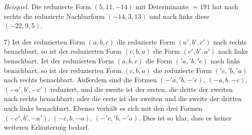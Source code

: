 \textit{Beispiel.} Die reduzierte Form $(5,11,-14)$ mit Determinante $=191$ hat nach rechts die reduzierte Nachbarform $(-14,3,13)$ und nach links diese $(-22,9,5)$.

7) Ist der reduzierten Form $(a,b,c)$ die reduzierte Form $(a',b',c')$ nach rechts benachbart, so ist der reduzierten Form $(c,b,a)$ die Form $(c',b',a')$ nach links benachbart. Ist der reduzierten Form $(a,b,c)$ die Form $({}'a,{}'b,{}'c)$ nach links benachbart, so ist der reduzierten Form $(c,b,a)$ die reduzierte Form $({}'c,{}'b,{}'a)$ nach rechts benachbart. Außerdem sind die Formen $(-{}'a,{}'b,-{}'c)$, $(-a,b,-c)$, $(-a',b',-c')$ reduziert, und die zweite ist der ersten, die dritte der zweiten nach rechts benachbart; oder die erste ist der zweiten und die zweite der dritten nach links benachbart. Ebenso verhält es sich mit den drei Formen $(-c',b',-a')$, $(-c,b,-a)$, $(-{}'c,{}'b,-{}'a)$. Dies ist so klar, dass es keiner weiteren Erläuterung bedarf.
